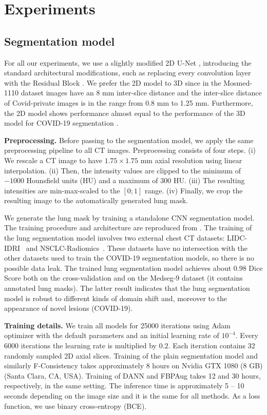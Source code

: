 \section{Experiments}

\subsection{Segmentation model}

For all our experiments, we use a  slightly modified 2D U-Net \cite{ronneberger2015u}, introducing the standard architectural modifications, such as replacing every convolution layer with the Residual Block \cite{he2016deep}. We prefer the 2D model to 3D since in the Mosmed-1110 dataset images have an 8 mm inter-slice distance and the inter-slice distance of Covid-private images is in the range from 0.8 mm to 1.25 mm. Furthermore, the 2D model shows performance almost equal to the performance of the 3D model for COVID-19 segmentation \cite{goncharov2021ct}.%

\textbf{Preprocessing.} Before passing to the segmentation model, we apply the same preprocessing pipeline to all CT images. Preprocessing consists of four steps. (i) We rescale a CT image to have $1.75 \times 1.75$ mm axial resolution {using linear interpolation}. (ii) Then, the intensity values are clipped to the minimum of $-1000$ Hounsfield units (HU) and a maximum of $300$ HU. (iii) The resulting intensities are min-max-scaled to the $[0; 1]$ range. (iv) Finally, we crop the resulting image to the automatically generated lung mask.

We generate the lung mask by training a standalone CNN segmentation model. The training procedure and architecture are reproduced from \cite{goncharov2021ct}. The training of the lung segmentation model involves two external chest CT datasets: LIDC-IDRI~\cite{lidc} and NSCLC-Radiomics~\cite{nsclc1,nsclc2}. These datasets have no intersection with the other datasets used to train the COVID-19 segmentation models, so there is no possible data leak. The trained lung segmentation model achieves about $0.98$ Dice Score both on the cross-validation and on the Medseg-9 dataset (it contains annotated lung masks). The latter result indicates that the lung segmentation model is robust to different kinds of domain shift and, moreover to the appearance of novel lesions (COVID-19).

\textbf{Training details.} We train all models for 25000 iterations using Adam~\cite{kingma2014adam} optimizer with the default parameters and an initial learning rate of $10^{-4}$. Every 6000 iterations the learning rate is multiplied by $0.2$. Each iteration contains 32 randomly sampled 2D axial slices. Training of the plain segmentation model and similarly F-Consistency takes approximately 8 hours on Nvidia GTX 1080 (8 GB) (Santa Clara, CA, USA). Training of DANN and FBPAug takes 12 and 30 hours, respectively, in the same setting. The inference time is approximately 5 -- 10 seconds depending on the image size and it is the same for all methods. As a loss function, we use binary cross-entropy (BCE).

